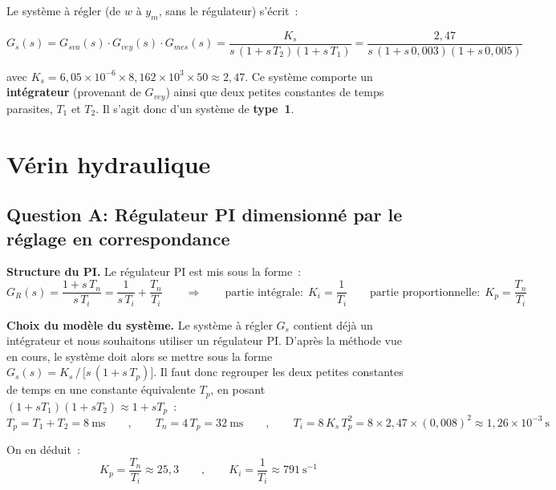 ﻿\documentclass[a4paper,5pt]{article}
\begin{document}
Le système à régler (de $w$ à $y_m$, sans le régulateur) s'écrit~:

\begin{equation}
G_s(s) = G_{sva}(s) \cdot G_{vey}(s) \cdot G_{mes}(s)
= \frac{K_s}{s\,(1+s\,T_2)(1+s\,T_1)}
= \frac{2{,}47}{s\,(1+s\,0{,}003)(1+s\,0{,}005)}
\end{equation}

avec $K_s = 6{,}05 \times 10^{-6} \times 8{,}162 \times 10^{3} \times 50 \approx 2{,}47$.
Ce système comporte un \textbf{intégrateur} (provenant de $G_{vey}$) ainsi que
deux petites constantes de temps parasites, $T_1$ et $T_2$. Il s'agit donc d'un
système de \textbf{type~1}.

\section{Vérin hydraulique}

\subsection{Question A: Régulateur PI dimensionné par le réglage en correspondance}

\textbf{Structure du PI.} Le régulateur PI est mis sous la forme~:
\begin{equation}
G_R(s) = \frac{1 + s\,T_n}{s\,T_i} = \frac{1}{s\,T_i} + \frac{T_n}{T_i}
\qquad\Rightarrow\qquad
\text{partie intégrale:} \ \ K_i = \frac{1}{T_i}
\qquad
\text{partie proportionnelle:} \ \ K_p = \frac{T_n}{T_i}
\end{equation}

\textbf{Choix du modèle du système.} Le système à régler $G_s$ contient déjà un
intégrateur et nous souhaitons utiliser un régulateur PI. D'après la méthode
vue en cours, le système doit alors se mettre sous la forme
$G_s(s) = K_s\,/\,\big[s\,(1+s\,T_p)\big]$. Il faut donc regrouper les deux
petites constantes de temps en une constante équivalente $T_p$, en posant
$(1+sT_1)(1+sT_2) \approx 1 + sT_p$~:
\begin{equation}
T_p = T_1 + T_2 = 8~\mathrm{ms}
\qquad,\qquad
T_n = 4\,T_p = 32~\mathrm{ms}
\qquad,\qquad
T_i = 8\,K_s\,T_p^{2} = 8 \times 2{,}47 \times (0{,}008)^2 \approx 1{,}26 \times 10^{-3}~\mathrm{s}
\end{equation}

On en déduit~:
\begin{equation}
K_p = \frac{T_n}{T_i} \approx \boxed{25{,}3}
\qquad,\qquad
K_i = \frac{1}{T_i} \approx \boxed{791~\mathrm{s^{-1}}}
\end{equation}
\end{document}
